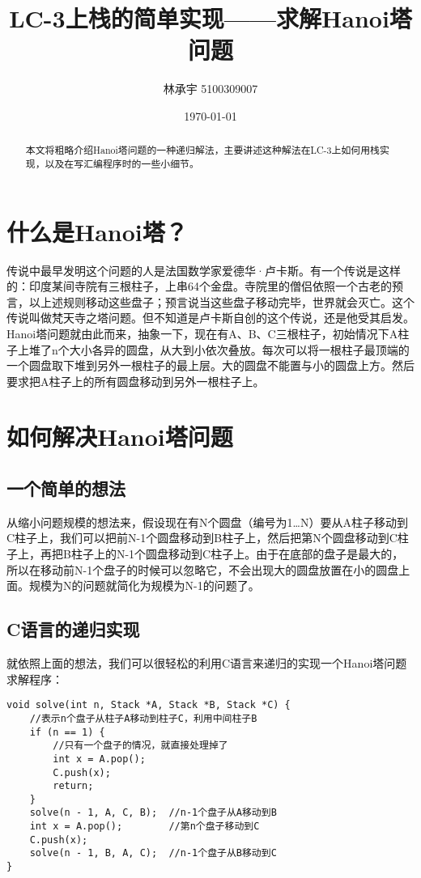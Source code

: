 \documentclass{article}
\title{LC-3上栈的简单实现——求解Hanoi塔问题}
\author{林承宇 5100309007}
\date{\today}
\begin{document}
\maketitle
\begin{abstract}
本文将粗略介绍Hanoi塔问题的一种递归解法，主要讲述这种解法在LC-3上如何用栈实现，以及在写汇编程序时的一些小细节。
\end{abstract}
\section{什么是Hanoi塔？}
传说中最早发明这个问题的人是法国数学家爱德华·卢卡斯。有一个传说是这样的：印度某间寺院有三根柱子，上串64个金盘。寺院里的僧侣依照一个古老的预言，以上述规则移动这些盘子；预言说当这些盘子移动完毕，世界就会灭亡。这个传说叫做梵天寺之塔问题。但不知道是卢卡斯自创的这个传说，还是他受其启发。\\
\indent Hanoi塔问题就由此而来，抽象一下，现在有A、B、C三根柱子，初始情况下A柱子上堆了n个大小各异的圆盘，从大到小依次叠放。每次可以将一根柱子最顶端的一个圆盘取下堆到另外一根柱子的最上层。大的圆盘不能置与小的圆盘上方。然后要求把A柱子上的所有圆盘移动到另外一根柱子上。
\section{如何解决Hanoi塔问题}
\subsection{一个简单的想法}
从缩小问题规模的想法来，假设现在有N个圆盘（编号为1…N）要从A柱子移动到C柱子上，我们可以把前N-1个圆盘移动到B柱子上，然后把第N个圆盘移动到C柱子上，再把B柱子上的N-1个圆盘移动到C柱子上。由于在底部的盘子是最大的，所以在移动前N-1个盘子的时候可以忽略它，不会出现大的圆盘放置在小的圆盘上面。规模为N的问题就简化为规模为N-1的问题了。
\subsection{C语言的递归实现}
就依照上面的想法，我们可以很轻松的利用C语言来递归的实现一个Hanoi塔问题求解程序：
\begin{verbatim}
void solve(int n, Stack *A, Stack *B, Stack *C) {
    //表示n个盘子从柱子A移动到柱子C，利用中间柱子B
    if (n == 1) {
        //只有一个盘子的情况，就直接处理掉了
        int x = A.pop();
        C.push(x);
        return;
    }
    solve(n - 1, A, C, B);	//n-1个盘子从A移动到B
    int x = A.pop();		//第n个盘子移动到C
    C.push(x);
    solve(n - 1, B, A, C);	//n-1个盘子从B移动到C
}
\end{verbatim}
\end{document}
